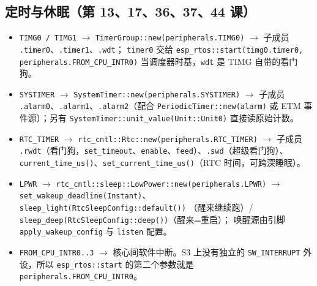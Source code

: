 \documentclass[UTF8,a4paper,11pt,fontset=fandol]{ctexart}
\newcommand{\fld}[1]{\texttt{#1}}
\begin{document}
\subsection{定时与休眠（第 13、17、36、37、44 课）}
\begin{itemize}
  \item \fld{TIMG0 / TIMG1} $\rightarrow$ \fld{TimerGroup::new(peripherals.TIMG0)} $\rightarrow$
    子成员 \fld{.timer0}、\fld{.timer1}、\fld{.wdt}；
    \fld{timer0} 交给 \fld{esp\_rtos::start(timg0.timer0, peripherals.FROM\_CPU\_INTR0)}
    当调度器时基，\fld{wdt} 是 TIMG 自带的看门狗。
  \item \fld{SYSTIMER} $\rightarrow$ \fld{SystemTimer::new(peripherals.SYSTIMER)} $\rightarrow$
    子成员 \fld{.alarm0}、\fld{.alarm1}、\fld{.alarm2}（配合 \fld{PeriodicTimer::new(alarm)}
    或 ETM 事件源）；另有 \fld{SystemTimer::unit\_value(Unit::Unit0)} 直接读原始计数。
  \item \fld{RTC\_TIMER} $\rightarrow$ \fld{rtc\_cntl::Rtc::new(peripherals.RTC\_TIMER)} $\rightarrow$
    子成员 \fld{.rwdt}（看门狗，\fld{set\_timeout}、\fld{enable}、\fld{feed}）、\fld{.swd}（超级看门狗）、
    \fld{current\_time\_us()}、\fld{set\_current\_time\_us()}（RTC 时间，可跨深睡眠）。
  \item \fld{LPWR} $\rightarrow$ \fld{rtc\_cntl::sleep::LowPower::new(peripherals.LPWR)} $\rightarrow$
    \fld{set\_wakeup\_deadline(Instant)}、\fld{sleep\_light(RtcSleepConfig::default())}
    （醒来继续跑）/ \fld{sleep\_deep(RtcSleepConfig::deep())}（醒来=重启）；
    唤醒源由引脚 \fld{apply\_wakeup\_config} 与 \fld{listen} 配置。
  \item \fld{FROM\_CPU\_INTR0..3} $\rightarrow$ 核心间软件中断。S3 上没有独立的
    \fld{SW\_INTERRUPT} 外设，所以 \fld{esp\_rtos::start} 的第二个参数就是
    \fld{peripherals.FROM\_CPU\_INTR0}。
\end{itemize}
\end{document}
